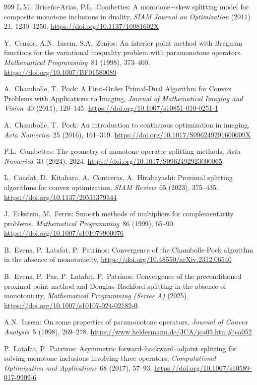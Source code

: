 \documentclass{article}
\begin{document}
\begin{thebibliography}{999}
L.M.\ Brice\~{n}o-Arias, P.L.\ Combettes: 
A monotone+skew splitting model for composite monotone inclusions in duality, 
\emph{SIAM Journal on Optimization} (2011) 21, 1230--1250. 
\url{https://doi.org/10.1137/10081602X}


Y.\ Censor, A.N.\ Iusem, S.A.\ Zenios: 
An interior point method with Bregman functions for the variational inequality problem with paramonotone operators. 
\emph{Mathematical Programming}~81 (1998), 373--400. \url{https://doi.org/10.1007/BF01580089}

A.\ Chambolle, T.\ Pock:
A First-Order Primal-Dual Algorithm for Convex Problems with Applications to Imaging,
\emph{Journal of Mathematical Imaging and Vision}~40 (2011), 120--145. \url{https://doi.org/10.1007/s10851-010-0251-1}

A.\ Chambolle, T.\ Pock:
An introduction to continuous optimization in imaging, 
\emph{Acta Numerica}~25 (2016), 161--319.
\url{https://doi.org/10.1017/S096249291600009X}

P.L.\ Combettes:
The geometry of monotone operator splitting methods, 
\emph{Acta Numerica}~33 (2024), 2024.
\url{https://doi.org/10.1017/S0962492923000065}

L.\ Condat, D.\ Kitahara, A.\ Contreras, A.\ Hirabayashi:
Proximal splitting algorithms for convex optimization, 
\emph{SIAM Review}~65 (2023), 375--435. 
\url{https://doi.org/10.1137/20M1379344}


J.\ Eckstein,  M.\ Ferris:
Smooth methods of multipliers for complementarity problems.
\emph{Mathematical Programming}~86 (1999), 65--90. 
\url{https://doi.org/10.1007/s101079900076}

B.\ Evens, P.\ Latafat, P.\ Patrinos:
Convergence of the Chambolle-Pock algorithm 
in the absence of monotonicity, 
\url{https://doi.org/10.48550/arXiv.2312.06540}

B.\ Evens, P.\ Pas, P.\ Latafat, P.\ Patrinos:
Convergence of the preconditioned proximal point method and Douglas--Rachford splitting in the absence of monotonicity, 
\emph{Mathematical Programming (Series A)} (2025).
\url{https://doi.org/10.1007/s10107-024-02182-0}

A.N.\ Iusem:
On some properties of paramonotone operators,
\emph{Journal of Convex Analysis}~5 (1998), 269--278.
\url{https://www.heldermann.de/JCA/jca05.htm#jca052}

P.\ Latafat, P.\ Patrinos:
Asymmetric forward–backward–adjoint splitting for
solving monotone inclusions involving three operators,
\emph{Computational Optimization and Applications}~68 (2017), 
57--93. 
\url{https://doi.org/10.1007/s10589-017-9909-6}



\end{thebibliography}
\end{document}
